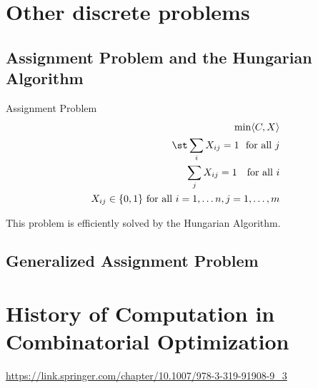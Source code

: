 \section{Other discrete problems}
\subsection{Assignment Problem and the Hungarian Algorithm}
\begin{general}{Assignment Problem}{\polynomial}
\begin{equation}
\begin{split}
\min \langle C, X\rangle\\
\st  \sum_{i} X_{ij} = 1 \ \text{ for all } j\\
\sum_j X_{ij} = 1 \ \ \text{ for all } i\\
X_{ij} \in \{0,1\} \text{ for all } i=1, \dots n,  j=1, \dots, m
\end{split}
\end{equation}
\end{general}

This problem is efficiently solved by the Hungarian Algorithm.

\subsection{Generalized Assignment Problem}



\section{History of Computation in Combinatorial Optimization}


\url{https://link.springer.com/chapter/10.1007/978-3-319-91908-9_3}